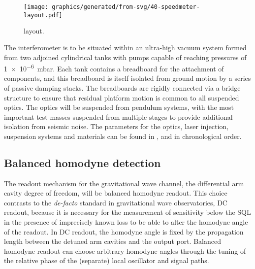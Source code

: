 \begin{figure}
  \centering
  \texttt{[image: graphics/generated/from-svg/40-speedmeter-layout.pdf]}
  \caption[\SSMEXPT{} layout]{\label{fig:ssm-layout}\SSMEXPT{} layout.}
\end{figure}

The interferometer is to be situated within an ultra-high vacuum system formed from two adjoined cylindrical tanks with pumps capable of reaching pressures of \SI{1e-6}{\milli\bar}. Each tank contains a breadboard for the attachment of components, and this breadboard is itself isolated from ground motion by a series of passive damping stacks. The breadboards are rigidly connected via a bridge structure to ensure that residual platform motion is common to all suspended optics. The optics will be suspended from pendulum systems, with the most important test masses suspended from multiple stages to provide additional isolation from seismic noise. The parameters for the optics, laser injection, suspension systems and materials can be found in \cite{Graef2014}, \cite{Danilishin2015} and \cite{Leavey2016} in chronological order.

\subsection{\label{sec:bhd-intro}Balanced homodyne detection}
The readout mechanism for the gravitational wave channel, the differential arm cavity degree of freedom, will be balanced homodyne readout. This choice contrasts to the \emph{de-facto} standard in gravitational wave observatories, \gls{DC} readout, because it is necessary for the measurement of sensitivity below the \gls{SQL} in the presence of imprecisely known loss to be able to alter the homodyne angle of the readout. In \gls{DC} readout, the homodyne angle is fixed by the propagation length between the detuned arm cavities and the output port. Balanced homodyne readout can choose arbitrary homodyne angles through the tuning of the relative phase of the (separate) local oscillator and signal paths.

